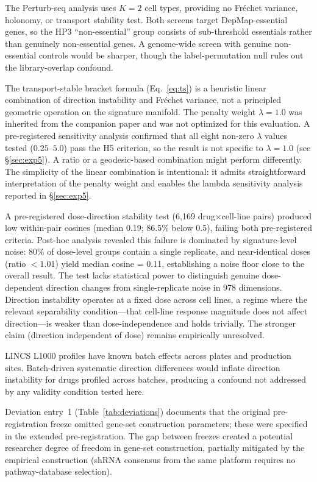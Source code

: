 \documentclass[11pt]{article}
\begin{document}
The Perturb-seq analysis uses $K = 2$ cell types, providing no Fr\'echet
variance, holonomy, or transport stability test. Both screens target
DepMap-essential genes, so the HP3 ``non-essential'' group consists of
sub-threshold essentials rather than genuinely non-essential genes. A
genome-wide screen with genuine non-essential controls would be sharper,
though the label-permutation null rules out the library-overlap confound.

The transport-stable bracket formula (Eq.~\ref{eq:ts}) is a heuristic
linear combination of direction instability and Fr\'echet variance, not a
principled geometric operation on the signature manifold. The penalty
weight $\lambda = 1.0$ was inherited from the companion paper
\citep{tower2026drug} and was not optimized for this evaluation. A
pre-registered sensitivity analysis confirmed that all eight non-zero
$\lambda$ values tested ($0.25$--$5.0$) pass the H5 criterion, so the
result is not specific to $\lambda = 1.0$ (see \S\ref{sec:exp5}).
A ratio or a geodesic-based combination might perform differently.
The simplicity of the linear combination is intentional: it admits
straightforward interpretation of the penalty weight and enables the
lambda sensitivity analysis reported in \S\ref{sec:exp5}.

A pre-registered dose-direction stability test (6{,}169
drug$\times$cell-line pairs) produced low within-pair cosines (median
0.19; 86.5\% below 0.5), failing both pre-registered criteria. Post-hoc
analysis revealed this failure is dominated by signature-level noise:
80\% of dose-level groups contain a single replicate, and
near-identical doses (ratio $< 1.01$) yield median cosine = 0.11,
establishing a noise floor close to the overall result. The test lacks
statistical power to distinguish genuine dose-dependent direction
changes from single-replicate noise in 978 dimensions.
Direction instability operates at a fixed dose across cell lines, a
regime where the relevant separability condition---that cell-line
response magnitude does not affect direction---is weaker than
dose-independence and holds trivially. The stronger claim (direction
independent of dose) remains empirically unresolved.

LINCS L1000 profiles have known batch effects across plates and
production sites. Batch-driven systematic direction differences would
inflate direction instability for drugs profiled across batches,
producing a confound not addressed by any validity condition tested here.

Deviation entry~1 (Table~\ref{tab:deviations}) documents that the
original pre-registration freeze omitted gene-set construction parameters;
these were specified in the extended pre-registration. The gap between
freezes created a potential researcher degree of freedom in gene-set
construction, partially mitigated by the empirical construction (shRNA
consensus from the same platform requires no pathway-database selection).
\end{document}

